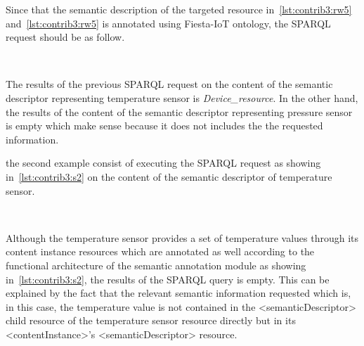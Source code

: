 Since that the semantic description of the targeted resource in~\ref{lst:contrib3:rw5} and~\ref{lst:contrib3:rw5} is annotated using Fiesta-IoT ontology, the SPARQL request should be as follow. 

 \lstset{caption=First SPARQL query, label=lst:contrib3:s1,
language=xml, breaklines=true, numbers=left, basicstyle=\small\ttfamily,
stepnumber=1, frame=single, inputencoding=utf8/latin1}~

The results of the previous SPARQL request on the content of the semantic descriptor representing temperature sensor is \textit{Device\_resource}. In the other hand, the results of the content of the semantic descriptor representing pressure sensor is empty which make sense because it does not includes the the requested information. \par 
{}
the second example consist of executing the SPARQL request as showing in~\ref{lst:contrib3:s2} on the content of the semantic descriptor of temperature sensor.

 \lstset{caption=Second SPARQL query, label=lst:contrib3:s2,
language=xml, breaklines=true, numbers=left, basicstyle=\small\ttfamily,
stepnumber=1, frame=single, inputencoding=utf8/latin1}~

Although the temperature sensor provides a set of temperature values through its content instance resources which are annotated as well according to the functional architecture of the semantic annotation module as showing in~\ref{lst:contrib3:s2}, the results of the SPARQL query is empty. This can be explained by the fact that the relevant semantic information requested which is, in this case, the temperature value is not contained in the <semanticDescriptor> child resource of the temperature sensor resource directly but in its <contentInstance>'s <semanticDescriptor> resource.\par 

